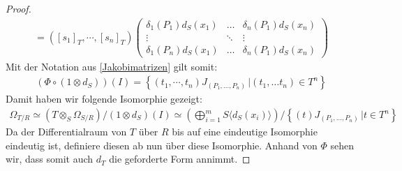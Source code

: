 \documentclass[10pt,a4paper]{report}
\newcommand{\divR}[2]{\Omega_{#1/#2}}
\newcommand{\divf}[1]{d_{#1}}
\newcommand{\Tensor}[3]{#1 \otimes_{#2} #3}
\newcommand{\tensor}[3]{#1 \otimes #3}
\begin{document}
\begin{proof}
\begin{gather*}
=
([s_1]_T , \cdots , [s_n]_T)
\begin{pmatrix}
\delta_1(P_1) \divf{S}(x_1) & \dots & \delta_n(P_1) \divf{S}(x_n)\\
\vdots & \ddots & \vdots \\
\delta_1(P_n) \divf{S}(x_1) & \dots & \delta_n(P_1) \divf{S}(x_n)
\end{pmatrix}
\end{gather*}
Mit der Notation aus \cref{Jakobimatrizen} gilt somit:
\begin{gather*}
(\Phi \circ (\tensor{1}{S}{\divf{S}}))(I) = \left\lbrace (t_1, \cdots, t_n) J_{(P_1,\dots, P_n)} \, \vert (t_1 , \dots t_n) \in T^n \right\rbrace
\end{gather*}
Damit haben wir folgende Isomorphie gezeigt:
\begin{gather*}
\divR{T}{R} 
\simeq (\Tensor{T}{S}{\divR{S}{R}}) / (\tensor{1}{S}{d_{S}})(I) 
\simeq \left( \bigoplus_{i =1}^m S \langle \divf{S}(x_i) \rangle \right) / \left\lbrace (t) J_{(P_1,\dots, P_n)} \, \vert t \in T^n \right\rbrace
\end{gather*}
Da der Differentialraum von $T$ über $R$ bis auf eine eindeutige Isomorphie eindeutig ist, definiere diesen ab nun über diese Isomorphie. Anhand von $\Phi$ sehen wir, dass somit auch $\divf{T}$ die geforderte Form annimmt.
\end{proof}


\ \\
\end{document}
